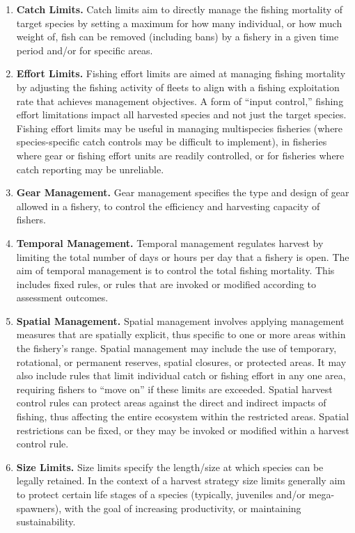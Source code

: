 \documentclass[
  11pt,
]{book}
\providecommand{\tightlist}{%
  \setlength{\itemsep}{0pt}\setlength{\parskip}{0pt}}
\begin{document}
\begin{itemize}
\begin{itemize}
    \begin{enumerate}
    \def\labelenumi{\alph{enumi}.}
    \tightlist
    \item
      \textbf{Catch Limits.} Catch limits aim to directly manage the fishing mortality of target species by setting a maximum for how many individual, or how much weight of, fish can be removed (including bans) by a fishery in a given time period and/or for specific areas.
    \item
      \textbf{Effort Limits.} Fishing effort limits are aimed at managing fishing mortality by adjusting the fishing activity of fleets to align with a fishing exploitation rate that achieves management objectives. A form of ``input control,'' fishing effort limitations impact all harvested species and not just the target species. Fishing effort limits may be useful in managing multispecies fisheries (where species-specific catch controls may be difficult to implement), in fisheries where gear or fishing effort units are readily controlled, or for fisheries where catch reporting may be unreliable.
    \item
      \textbf{Gear Management.} Gear management specifies the type and design of gear allowed in a fishery, to control the efficiency and harvesting capacity of fishers.
    \item
      \textbf{Temporal Management.} Temporal management regulates harvest by limiting the total number of days or hours per day that a fishery is open. The aim of temporal management is to control the total fishing mortality. This includes fixed rules, or rules that are invoked or modified according to assessment outcomes.
    \item
      \textbf{Spatial Management.} Spatial management involves applying management measures that are spatially explicit, thus specific to one or more areas within the fishery's range. Spatial management may include the use of temporary, rotational, or permanent reserves, spatial closures, or protected areas. It may also include rules that limit individual catch or fishing effort in any one area, requiring fishers to ``move on'' if these limits are exceeded. Spatial harvest control rules can protect areas against the direct and indirect impacts of fishing, thus affecting the entire ecosystem within the restricted areas. Spatial restrictions can be fixed, or they may be invoked or modified within a harvest control rule.
    \item
      \textbf{Size Limits.} Size limits specify the length/size at which species can be legally retained. In the context of a harvest strategy size limits generally aim to protect certain life stages of a species (typically, juveniles and/or mega-spawners), with the goal of increasing productivity, or maintaining sustainability.

\end{enumerate}
\end{itemize}
\end{itemize}
\end{document}
